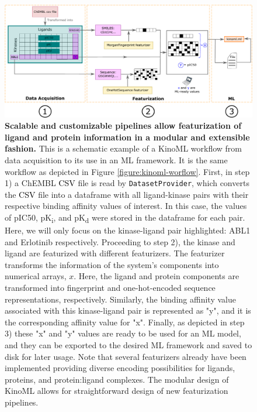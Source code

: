 \documentclass[9pt,lessons]{livecoms}
\newcommand{\revision}[1]{\textcolor{black}{#1}}
\begin{document}
\begin{figure}[ht]
    \centering
    \includegraphics[width=.8\textwidth]{figures/kinoml_tech_paper_fig_2_v4.pdf}
    \caption{\label{fig:featurization}
    \textbf{Scalable and customizable pipelines allow featurization of ligand and protein information in a modular and extensible fashion.}
    This is a schematic example of a KinoML workflow from data acquisition to its use in an ML framework. It is the same workflow as depicted in Figure \ref{figure:kinoml-worflow}. First, in step 1) a ChEMBL  \revision{CSV} file is read by \texttt{DatasetProvider}, which converts the \revision{CSV} file into a dataframe with all ligand-kinase pairs with their respective binding affinity values of interest. In this case, the values of pIC50, pK\textsubscript{i}, and pK\textsubscript{d} were stored in the dataframe for each pair. Here, we will only focus on the kinase-ligand pair highlighted: ABL1 and Erlotinib respectively. Proceeding to step 2), the kinase and ligand are featurized with different featurizers.  The featurizer transforms the information of the system's components into numerical arrays, $x$. Here, the ligand and protein components are transformed into fingerprint and one-hot-encoded sequence representations, respectively. Similarly, the binding affinity value associated with this kinase-ligand pair is represented as "y",  and it is the corresponding affinity value for "x". Finally, as depicted in step 3) these "x" and "y" values are ready to be used for an ML model, and they can be exported to the desired ML framework and saved to disk for later usage. Note that several featurizers already have been implemented providing diverse encoding possibilities for ligands, proteins, and protein:ligand complexes. The modular design of KinoML allows for straightforward design of new featurization pipelines.}
\end{figure}
\end{document}
